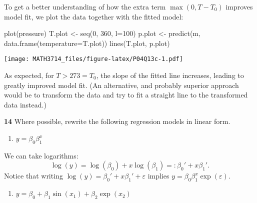 \documentclass[
  a4paper,
]{article}
\newenvironment{Shaded}{\begin{snugshade}}{\end{snugshade}}
\newcommand{\AttributeTok}[1]{\textcolor[rgb]{0.77,0.63,0.00}{#1}}
\newcommand{\DecValTok}[1]{\textcolor[rgb]{0.00,0.00,0.81}{#1}}
\newcommand{\FunctionTok}[1]{\textcolor[rgb]{0.00,0.00,0.00}{#1}}
\newcommand{\NormalTok}[1]{#1}
\newcommand{\OtherTok}[1]{\textcolor[rgb]{0.56,0.35,0.01}{#1}}
\providecommand{\tightlist}{%
  \setlength{\itemsep}{0pt}\setlength{\parskip}{0pt}}
\theoremstyle{definition}
\theoremstyle{definition}
\theoremstyle{definition}
\theoremstyle{definition}
\theoremstyle{remark}
\begin{document}
\begin{myanswers}
To get a better understanding of how the extra term
\(\max(0, T-T_0)\) improves model fit, we plot the data
together with the fitted model:

\begin{Shaded}
\begin{Highlighting}[]
\FunctionTok{plot}\NormalTok{(pressure)}
\NormalTok{T.plot }\OtherTok{\textless{}{-}} \FunctionTok{seq}\NormalTok{(}\DecValTok{0}\NormalTok{, }\DecValTok{360}\NormalTok{, }\AttributeTok{l=}\DecValTok{100}\NormalTok{)}
\NormalTok{p.plot }\OtherTok{\textless{}{-}} \FunctionTok{predict}\NormalTok{(m, }\FunctionTok{data.frame}\NormalTok{(}\AttributeTok{temperature=}\NormalTok{T.plot))}
\FunctionTok{lines}\NormalTok{(T.plot, p.plot)}
\end{Highlighting}
\end{Shaded}

\texttt{[image: MATH3714\_files/figure-latex/P04Q13c-1.pdf]}

As expected, for \(T > 273 = T_0\), the slope of the
fitted line increases, leading to greatly improved
model fit. (An alternative, and probably superior approach would
be to transform the data and try to fit a straight line to the
transformed data instead.)

\end{myanswers}

\textbf{14} Where possible, rewrite the following regression models in linear form.

\begin{enumerate}
\def\labelenumi{\alph{enumi}.}
\tightlist
\item
  \(y = \beta_0 \beta_1^x\)
\end{enumerate}

\begin{myanswers}
We can take logarithms:
\begin{equation*}
  \log(y)
  = \log(\beta_0) + x \log(\beta_1)
  =: \beta_0' + x \beta_1'.
\end{equation*}
Notice that writing \(\log(y) = \beta_0' + x \beta_1' + \varepsilon\)
implies \(y = \beta_0 \beta_1^x \exp(\varepsilon)\).

\end{myanswers}

\begin{enumerate}
\def\labelenumi{\alph{enumi}.}
\setcounter{enumi}{1}
\tightlist
\item
  \(y = \beta_0 + \beta_1 \sin(x_1) + \beta_2 \exp(x_2)\)
\end{enumerate}
\end{document}
